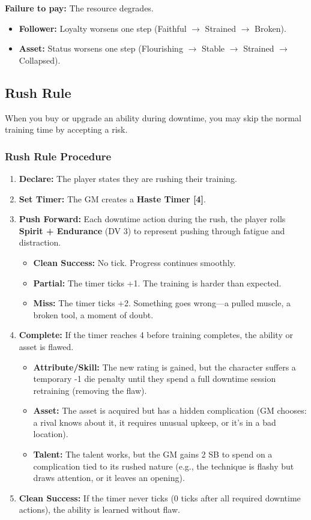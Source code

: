 \textbf{Failure to pay:} The resource degrades.
\begin{itemize}
  \item \textbf{Follower:} Loyalty worsens one step (Faithful $\rightarrow$ Strained $\rightarrow$ Broken).
  \item \textbf{Asset:} Status worsens one step (Flourishing $\rightarrow$ Stable $\rightarrow$ Strained $\rightarrow$ Collapsed).
\end{itemize}

\subsection{Rush Rule}

When you buy or upgrade an ability during downtime, you may skip the normal training time by accepting a risk.

\subsubsection{Rush Rule Procedure}

\begin{enumerate}
  \item \textbf{Declare:} The player states they are rushing their training.
  \item \textbf{Set Timer:} The GM creates a \textbf{Haste Timer [4]}.
  \item \textbf{Push Forward:} Each downtime action during the rush, the player rolls \textbf{Spirit + Endurance} (DV 3) to represent pushing through fatigue and distraction.
    \begin{itemize}
      \item \textbf{Clean Success:} No tick. Progress continues smoothly.
      \item \textbf{Partial:} The timer ticks +1. The training is harder than expected.
      \item \textbf{Miss:} The timer ticks +2. Something goes wrong---a pulled muscle, a broken tool, a moment of doubt.
    \end{itemize}
  \item \textbf{Complete:} If the timer reaches 4 before training completes, the ability or asset is flawed.
    \begin{itemize}
      \item \textbf{Attribute/Skill:} The new rating is gained, but the character suffers a temporary -1 die penalty until they spend a full downtime session retraining (removing the flaw).
      \item \textbf{Asset:} The asset is acquired but has a hidden complication (GM chooses: a rival knows about it, it requires unusual upkeep, or it's in a bad location).
      \item \textbf{Talent:} The talent works, but the GM gains 2 SB to spend on a complication tied to its rushed nature (e.g., the technique is flashy but draws attention, or it leaves an opening).
    \end{itemize}
  \item \textbf{Clean Success:} If the timer never ticks (0 ticks after all required downtime actions), the ability is learned without flaw.
\end{enumerate}

